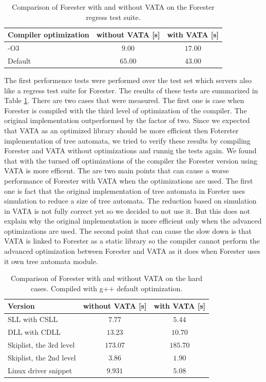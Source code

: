 \begin{table}[buh]
	\vskip6pt
	\centering
	\begin{tabular}{|l | c | c |}
		\hline
		Compiler optimization & without VATA [s] & with VATA [s] \\
		\hline
		\hline
		-O3        & $9.00$ & $17.00$ \\
		\hline
		Default    & $65.00$ & $43.00$ \\
		\hline
	\end{tabular}
	\caption{Comparison of Forester with and without VATA on the Forester regress test suite.
	}
	\label{tab:vataregre}
\end{table}

The first performence tests were performed over the test set
which servers also like a regress test suite for Forester.
The results of these tests are summarized in Table \ref{tab:vataregre}.
There are two cases that were measured.
The first one is case when Forester is compiled with the third level of optimization of the compiler.
The original implementation outperformed by the factor of two.
Since we expected that VATA as an optimized library should be more efficient
then Foterster implementation of tree automata, we tried to verify these results
by compiling Forester and VATA without optimizations and runnig the tests again.
We found that with the turned off optimizations of the compiler
the Forester version using VATA is more efficent.
The are two main points that can cause a worse performance of Forester with VATA
when the optimizations are used.
The first one is fact that the original implementation of tree automata
in Foreter uses simulation to reduce a size of tree automata.
The reduction based on simulation in VATA is not fully correct yet
so we decided to not use it.
But this does not explain why the original implementation is more efficient
only when the advanced optimizations are used.
The second point that can cause the slow down is
that VATA is linked to Forester as a static library so the compiler cannot
perform the advanced optimization between Forester and VATA as it does
when Forester uses it own tree automata module.


\begin{table}[buh]
	\vskip6pt
	\centering
	\begin{tabular}{|l | c | c |}
		\hline
		Version & without VATA [s] & with VATA [s] \\
		\hline
		\hline
		SLL with CSLL            & $7.77$ & $5.44$ \\
		\hline
		DLL with CDLL            & $13.23$ & $10.70$ \\
		\hline
		Skiplist, the 3rd level  & $173.07$ & $185.70$ \\
		\hline
		Skiplist, the 2nd level  & $3.86$ & $1.90$ \\
		\hline
		Linux driver snippet     & $9.931$ & $5.08$  \\ 
		\hline
	\end{tabular}
	\caption{Comparison of Forester with and without VATA on the hard cases.
		Compiled with g++ default optimization.
	}
	\label{tab:vatadef}
\end{table}

